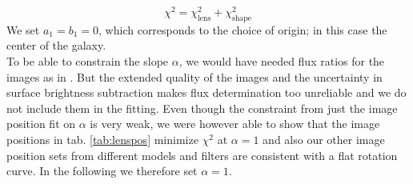 \begin{equation*}
\chi^2 = \chi^2_\text{lens} + \chi^2_\text{shape}
\end{equation*}
We set $a_1 = b_1 = 0$, which corresponds to the choice of origin; in this case the center of the galaxy.
\\To be able to constrain the slope $\alpha$, we would have needed flux ratios for the images as in \citet{GlennEC}. But the extended quality of the images and the uncertainty in surface brightness subtraction makes flux determination too unreliable and we do not include them in the fitting. Even though the constraint from just the image position fit on $\alpha$ is very weak, we were however able to show that the image positions in tab. \ref{tab:lenspos} minimize $\chi^2$ at $\alpha=1$ and also our other image position sets from different models and filters are consistent with a flat rotation curve. In the following we therefore set $\alpha=1$.
